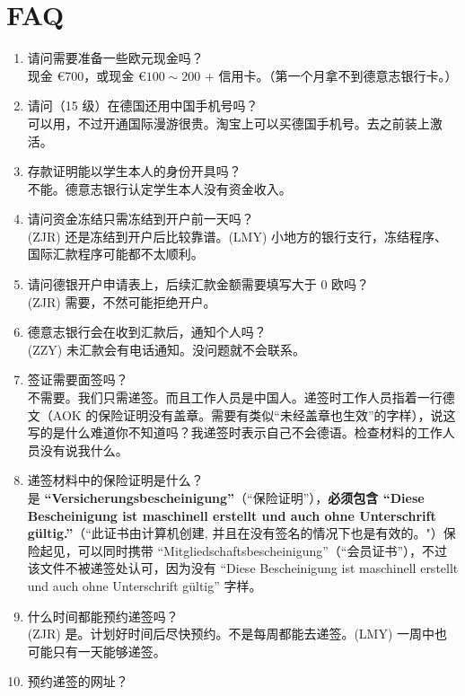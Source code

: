 \documentclass[oneside,final]{book}
\begin{document}
\chapter{FAQ}\label{chap:faq}
\begin{enumerate}
  \item 请问需要准备一些欧元现金吗？ \\
  现金 \euro{700}，或现金 \euro{$100 \sim 200$} + 信用卡。（第一个月拿不到德意志银行卡。）
  \item 请问（15 级）在德国还用中国手机号吗？ \\
  可以用，不过开通国际漫游很贵。淘宝上可以买德国手机号。去之前装上激活。
  \item 存款证明能以学生本人的身份开具吗？ \\
  不能。德意志银行认定学生本人没有资金收入。
  \item 请问资金冻结只需冻结到开户前一天吗？ \\
  (ZJR) 还是冻结到开户后比较靠谱。(LMY) 小地方的银行支行，冻结程序、国际汇款程序可能都不太顺利。
  \item 请问德银开户申请表上，后续汇款金额需要填写大于 0 欧吗？ \\
  (ZJR) 需要，不然可能拒绝开户。
  \item 德意志银行会在收到汇款后，通知个人吗？ \\
  (ZZY) 未汇款会有电话通知。没问题就不会联系。
  \item 签证需要面签吗？ \\
  不需要。我们只需递签。而且工作人员是中国人。递签时工作人员指着一行德文（AOK 的保险证明没有盖章。需要有类似“未经盖章也生效”的字样），说这写的是什么难道你不知道吗？我递签时表示自己不会德语。检查材料的工作人员没有说我什么。
  \item 递签材料中的保险证明是什么？ \\
  是 \textbf{``Versicherungsbescheinigung''}（“保险证明”），\textbf{必须包含 ``Diese Bescheinigung ist maschinell erstellt und auch ohne Unterschrift gültig.''}（“此证书由计算机创建, 并且在没有签名的情况下也是有效的。"）{\color{gray}保险起见，可以同时携带 ``Mitgliedschaftsbescheinigung''（“会员证书”），不过该文件不被递签处认可，因为没有 ``Diese Bescheinigung ist maschinell erstellt und auch ohne Unterschrift gültig'' 字样。}
  \item 什么时间都能预约递签吗？ \\
  (ZJR) 是。计划好时间后尽快预约。不是每周都能去递签。(LMY) 一周中也可能只有一天能够递签。
  \item 预约递签的网址？ \\

\end{enumerate}
\end{document}

